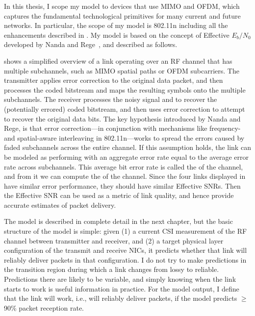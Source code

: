 In this thesis, I scope my model to devices that use MIMO and OFDM, which captures the fundamental technological primitives for many current and future networks. In particular, the scope of my model is 802.11n including all the enhancements described in . My model is based on the concept of Effective $E_b/N_0$ developed by Nanda and Rege~\cite{Nanda_EffectiveSNR}, and described as follows.
 
 shows a simplified overview of a link operating over an RF channel that has multiple subchannels, such as MIMO spatial paths or OFDM subcarriers. The transmitter applies error correction to the original data packet, and then processes the coded bitstream and maps the resulting symbols onto the multiple subchannels. The receiver processes the noisy signal and to recover the (potentially errored) coded bitstream, and then uses error correction to attempt to recover the original data bits. The key hypothesis introduced by Nanda and Rege, is that error correction---in conjunction with mechanisms like frequency- and spatial-aware interleaving in 802.11n---works to spread the errors caused by faded subchannels across the entire channel. If this assumption holds, the link can be modeled as performing with an aggregate error rate equal to the average error rate across subchannels. This average bit error rate is called the  of the channel, and from it we can compute the  of the channel. Since the four links displayed in  have similar error performance, they should have similar Effective SNRs. Then the Effective SNR can be used as a metric of link quality, and hence provide accurate estimates of packet delivery.

The model is described in complete detail in the next chapter, but the basic structure of the model is simple: given (1) a current CSI measurement of the RF channel between transmitter and receiver, and (2) a target physical layer configuration of the transmit and receive NICs, it predicts whether that link will reliably deliver packets in that configuration. I do not try to make predictions in the transition region during which a link changes from lossy to reliable. Predictions there are likely to be variable, and simply knowing when the link starts to work is useful information in practice. For the model output, I define that the link will work, i.e., will reliably deliver packets, if the model predicts $\geq$90\% packet reception rate.

